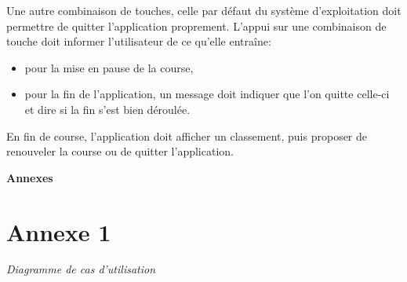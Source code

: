 \documentclass[a4paper, 11pt]{article}
\renewcommand{\appendixpage}{\huge \textbf{Annexes} \normalsize}
\begin{document}
				Une autre combinaison de touches, celle par défaut du système d'exploitation doit permettre de quitter l'application proprement. L'appui sur une combinaison de touche doit informer l'utilisateur de ce qu'elle entraîne:
				\begin{itemize}
					\item pour la mise en pause de la course, 
					\item pour la fin de l'application, un message doit indiquer que l'on quitte celle-ci et dire si la fin s'est bien déroulée.\\
				\end{itemize}
			
			En fin de course, l'application doit afficher un classement, puis proposer de renouveler la course ou de quitter l'application.
		
	\newpage	
	
	\begin{appendix} 
	\appendixpage
	\addappheadtotoc
	
	\vspace*{1cm}
		\chapter{\textbf{Annexe 1}}
		
		\begin{center}
			\vspace*{3cm}
			\emph{Diagramme de cas d'utilisation}		
		\end{center}
		
		\newpage
		
		


		
	\end{appendix}
		
	\tableofcontents
		
\end{document}
